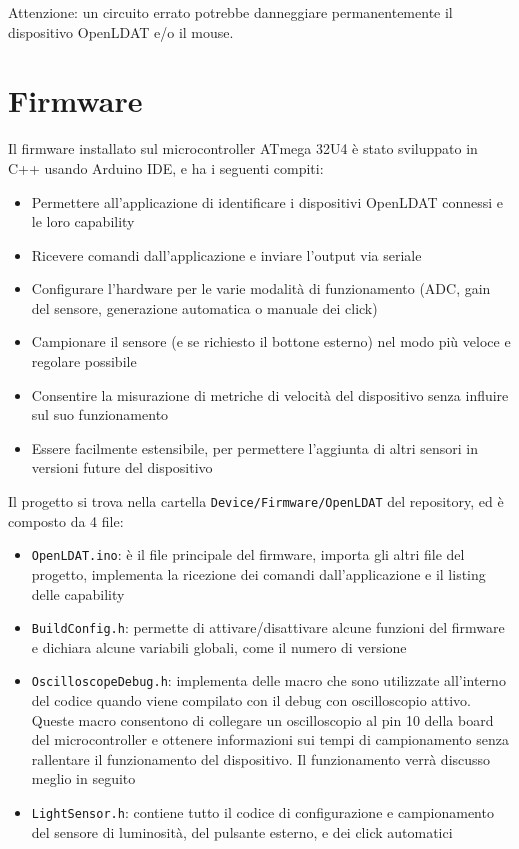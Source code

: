 Attenzione: un circuito errato potrebbe danneggiare permanentemente il dispositivo OpenLDAT e/o il mouse.

\section{Firmware}
Il firmware installato sul microcontroller ATmega 32U4 è stato sviluppato in C++ usando Arduino IDE, e ha i seguenti compiti:
\begin{itemize}
	\item Permettere all'applicazione di identificare i dispositivi OpenLDAT connessi e le loro capability
	\item Ricevere comandi dall'applicazione e inviare l'output via seriale
	\item Configurare l'hardware per le varie modalità di funzionamento (ADC, gain del sensore, generazione automatica o manuale dei click)
	\item Campionare il sensore (e se richiesto il bottone esterno) nel modo più veloce e regolare possibile
	\item Consentire la misurazione di metriche di velocità del dispositivo senza influire sul suo funzionamento
	\item Essere facilmente estensibile, per permettere l'aggiunta di altri sensori in versioni future del dispositivo
\end{itemize}

Il progetto si trova nella cartella \texttt{Device/Firmware/OpenLDAT} del repository, ed è composto da 4 file:
\begin{itemize}
	\item \texttt{OpenLDAT.ino}: è il file principale del firmware, importa gli altri file del progetto, implementa la ricezione dei comandi dall'applicazione e il listing delle capability
	\item \texttt{BuildConfig.h}: permette di attivare/disattivare alcune funzioni del firmware e dichiara alcune variabili globali, come il numero di versione
	\item \texttt{OscilloscopeDebug.h}: implementa delle macro che sono utilizzate all'interno del codice quando viene compilato con il debug con oscilloscopio attivo. Queste macro consentono di collegare un oscilloscopio al pin 10 della board del microcontroller e ottenere informazioni sui tempi di campionamento senza rallentare il funzionamento del dispositivo. Il funzionamento verrà discusso meglio in seguito
	\item \texttt{LightSensor.h}: contiene tutto il codice di configurazione e campionamento del sensore di luminosità, del pulsante esterno, e dei click automatici
\end{itemize}

